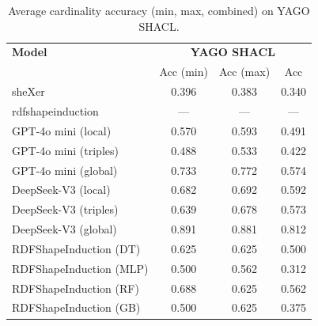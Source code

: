 \begin{table}[h]
\centering
\begin{tabular}{l|ccc}
\hline
\textbf{Model} & \multicolumn{3}{c}{\textbf{YAGO SHACL}} \\
 & Acc (min) & Acc (max) & Acc \\
\hline
sheXer & 0.396 & 0.383 & 0.340 \\
rdfshapeinduction & --- & --- & --- \\
GPT-4o mini (local) & 0.570 & 0.593 & 0.491 \\
GPT-4o mini (triples) & 0.488 & 0.533 & 0.422 \\
GPT-4o mini (global) & 0.733 & 0.772 & 0.574 \\
DeepSeek-V3 (local) & 0.682 & 0.692 & 0.592 \\
DeepSeek-V3 (triples) & 0.639 & 0.678 & 0.573 \\
DeepSeek-V3 (global) & 0.891 & 0.881 & 0.812 \\
RDFShapeInduction (DT) & 0.625 & 0.625 & 0.500 \\
RDFShapeInduction (MLP) & 0.500 & 0.562 & 0.312 \\
RDFShapeInduction (RF) & 0.688 & 0.625 & 0.562 \\
RDFShapeInduction (GB) & 0.500 & 0.625 & 0.375 \\
\hline
\end{tabular}
\caption{Average cardinality accuracy (min, max, combined) on YAGO SHACL.}
\label{tab:t9-cardinality-yago}
\end{table}
